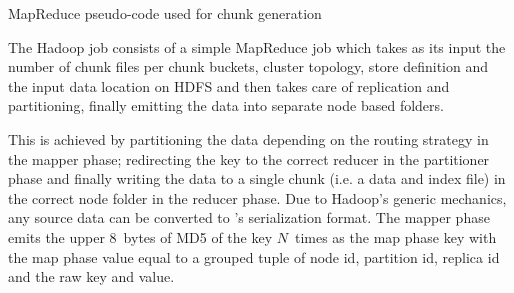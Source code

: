 \begin{algorithm}
\scriptsize
\DontPrintSemicolon
{}


\BlankLine
{}



\BlankLine
{} 

\BlankLine
\caption{MapReduce pseudo-code used for chunk generation}
\label{fig:mapreduce-chunk-generation}
\end{algorithm}

The Hadoop job consists of a simple MapReduce job which takes as its
input the number of chunk files per chunk buckets, cluster topology, 
store definition and the input data location on HDFS and then 
takes care of replication and partitioning, finally emitting the 
data into separate node based folders. 

This is achieved by partitioning the data depending on the routing
strategy in the mapper phase; redirecting the key to the correct reducer 
in the partitioner phase and finally writing the data to a single
chunk (i.e. a data and index file) in the correct node folder in the
reducer phase. Due to Hadoop's generic  mechanics, any source data
can be converted to \projectname{}'s serialization format. The mapper
phase emits the upper 8~bytes of MD5 of the \projectname{} key
$N$~times as the map phase key with the map phase value equal to a
grouped tuple of node id, partition id, replica id and the raw
\projectname{} key and value. 

